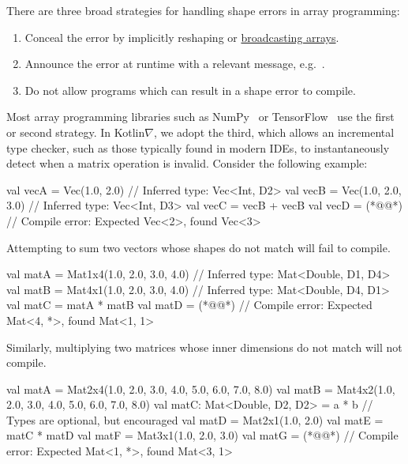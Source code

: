 \noindent There are three broad strategies for handling shape errors in array programming:
%
\begin{enumerate}
    \item Conceal the error by implicitly reshaping or \href{https://docs.scipy.org/doc/numpy-1.15.0/user/basics.broadcasting.html}{broadcasting arrays}.
    \item Announce the error at runtime with a relevant message, e.g.~\href{https://www.tensorflow.org/api_docs/python/tf/errors/InvalidArgumentError}{}.
    \item Do not allow programs which can result in a shape error to compile. \\
\end{enumerate}
%
Most array programming libraries such as NumPy~\citep{van2011numpy} or TensorFlow~\citep{abadi2016tensorflow} use the first or second strategy. In Kotlin$\nabla$, we adopt the third, which allows an incremental type checker, such as those typically found in modern IDEs, to instantaneously detect when a matrix operation is invalid. Consider the following example:
%
\begin{kotlinlisting}
val vecA = Vec(1.0, 2.0)      // Inferred type: Vec<Int, D2>
val vecB = Vec(1.0, 2.0, 3.0) // Inferred type: Vec<Int, D3>
val vecC = vecB + vecB
val vecD = (*@@*) // Compile error: Expected Vec<2>, found Vec<3>
\end{kotlinlisting}
%
Attempting to sum two vectors whose shapes do not match will fail to compile.
%
\begin{kotlinlisting}
val matA = Mat1x4(1.0, 2.0, 3.0, 4.0) // Inferred type: Mat<Double, D1, D4>
val matB = Mat4x1(1.0, 2.0, 3.0, 4.0) // Inferred type: Mat<Double, D4, D1>
val matC = matA * matB
val matD = (*@@*) // Compile error: Expected Mat<4, *>, found Mat<1, 1>
\end{kotlinlisting}
%
Similarly, multiplying two matrices whose inner dimensions do not match will not compile.
%
\begin{kotlinlisting}
val matA = Mat2x4(1.0, 2.0, 3.0, 4.0,
                  5.0, 6.0, 7.0, 8.0)
val matB = Mat4x2(1.0, 2.0,
                  3.0, 4.0,
                  5.0, 6.0,
                  7.0, 8.0)
val matC: Mat<Double, D2, D2> = a * b // Types are optional, but encouraged
val matD = Mat2x1(1.0, 2.0)
val matE = matC * matD
val matF = Mat3x1(1.0, 2.0, 3.0)
val matG = (*@@*) // Compile error: Expected Mat<1, *>, found Mat<3, 1>
\end{kotlinlisting}
